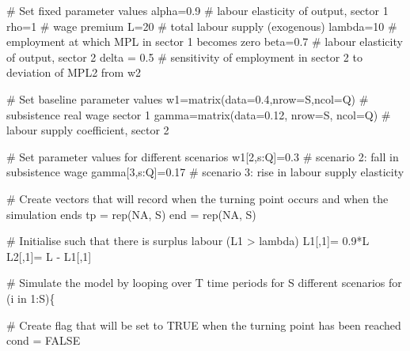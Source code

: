 \documentclass[
  letterpaper,
  DIV=11,
  numbers=noendperiod]{scrreprt}
\newenvironment{Shaded}{\begin{snugshade}}{\end{snugshade}}
\newcommand{\AttributeTok}[1]{\textcolor[rgb]{0.40,0.45,0.13}{#1}}
\newcommand{\CommentTok}[1]{\textcolor[rgb]{0.37,0.37,0.37}{#1}}
\newcommand{\ConstantTok}[1]{\textcolor[rgb]{0.56,0.35,0.01}{#1}}
\newcommand{\ControlFlowTok}[1]{\textcolor[rgb]{0.00,0.23,0.31}{#1}}
\newcommand{\DecValTok}[1]{\textcolor[rgb]{0.68,0.00,0.00}{#1}}
\newcommand{\FloatTok}[1]{\textcolor[rgb]{0.68,0.00,0.00}{#1}}
\newcommand{\FunctionTok}[1]{\textcolor[rgb]{0.28,0.35,0.67}{#1}}
\newcommand{\NormalTok}[1]{\textcolor[rgb]{0.00,0.23,0.31}{#1}}
\newcommand{\OtherTok}[1]{\textcolor[rgb]{0.00,0.23,0.31}{#1}}
\newcommand{\SpecialCharTok}[1]{\textcolor[rgb]{0.37,0.37,0.37}{#1}}
\begin{document}
\begin{Shaded}
\begin{Highlighting}[]
\CommentTok{\# Set fixed parameter values}
\NormalTok{alpha}\OtherTok{=}\FloatTok{0.9} \CommentTok{\# labour elasticity of output, sector 1}
\NormalTok{rho}\OtherTok{=}\DecValTok{1}     \CommentTok{\# wage premium}
\NormalTok{L}\OtherTok{=}\DecValTok{20}      \CommentTok{\# total labour supply (exogenous)}
\NormalTok{lambda}\OtherTok{=}\DecValTok{10} \CommentTok{\# employment at which MPL in sector 1 becomes zero}
\NormalTok{beta}\OtherTok{=}\FloatTok{0.7}  \CommentTok{\# labour elasticity of output, sector 2}
\NormalTok{delta }\OtherTok{=} \FloatTok{0.5}  \CommentTok{\# sensitivity of employment in sector 2 to deviation of MPL2 from w2}

\CommentTok{\# Set baseline parameter values}
\NormalTok{w1}\OtherTok{=}\FunctionTok{matrix}\NormalTok{(}\AttributeTok{data=}\FloatTok{0.4}\NormalTok{,}\AttributeTok{nrow=}\NormalTok{S,}\AttributeTok{ncol=}\NormalTok{Q) }\CommentTok{\# subsistence real wage sector 1}
\NormalTok{gamma}\OtherTok{=}\FunctionTok{matrix}\NormalTok{(}\AttributeTok{data=}\FloatTok{0.12}\NormalTok{, }\AttributeTok{nrow=}\NormalTok{S, }\AttributeTok{ncol=}\NormalTok{Q) }\CommentTok{\# labour supply coefficient, sector 2}

\CommentTok{\# Set parameter values for different scenarios}
\NormalTok{w1[}\DecValTok{2}\NormalTok{,s}\SpecialCharTok{:}\NormalTok{Q]}\OtherTok{=}\FloatTok{0.3}         \CommentTok{\# scenario 2: fall in subsistence wage}
\NormalTok{gamma[}\DecValTok{3}\NormalTok{,s}\SpecialCharTok{:}\NormalTok{Q]}\OtherTok{=}\FloatTok{0.17}     \CommentTok{\# scenario 3: rise in labour supply elasticity}

\CommentTok{\# Create vectors that will record when the turning point occurs and when the simulation ends}
\NormalTok{tp }\OtherTok{=} \FunctionTok{rep}\NormalTok{(}\ConstantTok{NA}\NormalTok{, S)}
\NormalTok{end }\OtherTok{=} \FunctionTok{rep}\NormalTok{(}\ConstantTok{NA}\NormalTok{, S)}

\CommentTok{\# Initialise such that there is surplus labour (L1 \textgreater{} lambda)}
\NormalTok{L1[,}\DecValTok{1}\NormalTok{]}\OtherTok{=} \FloatTok{0.9}\SpecialCharTok{*}\NormalTok{L}
\NormalTok{L2[,}\DecValTok{1}\NormalTok{]}\OtherTok{=}\NormalTok{ L }\SpecialCharTok{{-}}\NormalTok{ L1[,}\DecValTok{1}\NormalTok{]}

\CommentTok{\# Simulate the model by looping over T time periods for S different scenarios}
\ControlFlowTok{for}\NormalTok{ (i }\ControlFlowTok{in} \DecValTok{1}\SpecialCharTok{:}\NormalTok{S)\{}
  
  \CommentTok{\# Create flag that will be set to TRUE when the turning point has been reached}
\NormalTok{  cond }\OtherTok{=} \ConstantTok{FALSE}
  

\end{Highlighting}
\end{Shaded}
\end{document}
